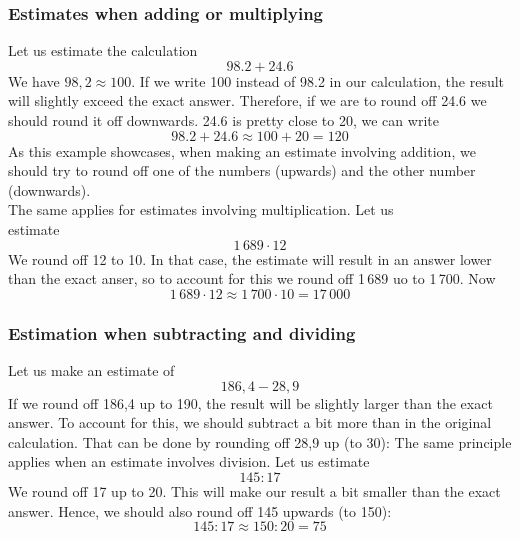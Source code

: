 
\subsubsection{Estimates when adding or multiplying}
Let us estimate the calculation
\[ 98.2+24.6 \]
We have $ 98,2 \approx 100 $. If we write 100 instead of 98.2 in our calculation, the result will slightly exceed the exact answer. Therefore, if we are to round off 24.6 we should round it off downwards. 24.6 is pretty close to 20, we can write
\[ 98.2+24.6 \approx 100 + 20 = 120 \]
As this example showcases, when making an estimate involving addition, we should try to round off one of the numbers (upwards) and the other number (downwards).\\

\linje
The same applies for estimates involving multiplication. Let us\\ estimate
\[ 1\,689\cdot12 \]
We round off 12 to 10. In that case, the estimate will result in an answer lower than the exact anser, so to account for this we round off 1\,689 uo to 1\,700. Now
\[ 1\,689\cdot12\approx 1\,700\cdot 10 =17\,000 \]
\subsubsection{Estimation when subtracting and dividing}
Let us make an estimate of
\[ 186,4-28,9 \]
If we round off 186,4 up to 190, the result will be slightly larger than the exact answer. To account for this, we should subtract a bit more than in the original calculation. That can be done by rounding off 28,9 up (to 30):
\linje
The same principle applies when an estimate involves division. Let us estimate
\[ 145:17 \]
We round off 17 up to 20. This will make our result a bit smaller than the exact answer. Hence, we should also round off 145 upwards (to 150):
\[ 145:17 \approx 150:20 = 75 \]

